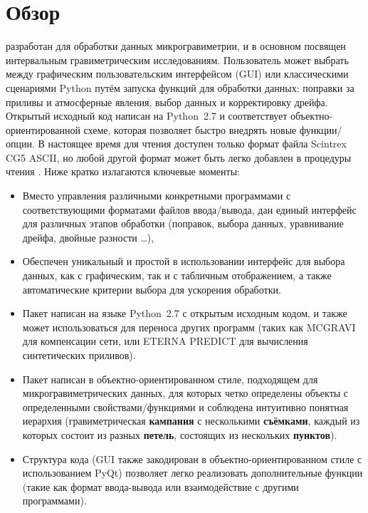 \chapter[Обзор]{Обзор}
\label{overview}

\pg{} \cite{hector_2016} разработан для обработки данных микрогравиметрии, и в
основном посвящен интервальным гравиметрическим исследованиям.  Пользователь
может выбрать между графическим пользовательским интерфейсом (GUI) или
классическими сценариями Python путём запуска функций \pg{} для обработки
данных: поправки за приливы и атмосферные явления, выбор данных и корректировку
дрейфа.  Открытый исходный код написан на Python~2.7 и соответствует
объектно-ориентированной схеме, которая позволяет быстро внедрять новые
функции/опции. В настоящее время для чтения доступен только формат файла
Scintrex CG5 ASCII, но любой другой формат может быть легко добавлен в процедуры
чтения \pg{}. Ниже кратко излагаются ключевые моменты:
\begin{itemize}
    \item Вместо управления различными конкретными программами с
    соответствующими форматами файлов ввода/вывода, дан единый интерфейс для
    различных этапов обработки (поправок, выбора данных, уравнивание дрейфа,
    двойные разности \dots),

    \item Обеспечен уникальный и простой в использовании интерфейс для выбора
    данных, как с графическим, так и с табличным отображением, а также
    автоматические критерии выбора для ускорения обработки.
    
    \item Пакет написан на языке Python~2.7 с открытым исходным кодом, и также
    может использоваться для переноса других программ (таких как MCGRAVI для
    компенсации сети, или ETERNA PREDICT для вычисления синтетических приливов).
    
    \item Пакет написан в объектно-ориентированном стиле, подходящем для
    микрогравиметрических данных, для которых четко определены объекты с
    определенными свойствами/функциями и соблюдена интуитивно понятная иерархия
    (гравиметрическая \textbf{кампания} с несколькими \textbf{съёмками}, каждый
    из которых состоит из разных \textbf{петель}, состоящих из нескольких
    \textbf{пунктов}).
    
    \item Структура кода (GUI также закодирован в объектно-ориентированном стиле
    с использованием PyQt) позволяет легко реализовать дополнительные функции
    (такие как формат ввода-вывода или взаимодействие с другими программами).

\end{itemize}

